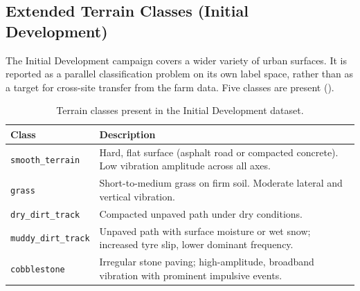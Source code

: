 \subsection{Extended Terrain Classes (Initial Development)}

The Initial Development campaign covers a wider variety of urban surfaces. It is reported as a parallel classification problem on its own label space, rather than as a target for cross-site transfer from the farm data. Five classes are present
().

\begin{table}[H]
\centering
\caption{Terrain classes present in the Initial Development dataset.}
\label{tab:main_terrain_classes}
\begin{tabular}{lp{10cm}}
\toprule
\textbf{Class} & \textbf{Description} \\
\midrule
\texttt{smooth\_terrain}    & Hard, flat surface (asphalt road or compacted concrete). Low vibration amplitude across all axes. \\
\texttt{grass}              & Short-to-medium grass on firm soil. Moderate lateral and vertical vibration. \\
\texttt{dry\_dirt\_track}   & Compacted unpaved path under dry conditions. \\
\texttt{muddy\_dirt\_track} & Unpaved path with surface moisture or wet snow; increased tyre slip, lower dominant frequency. \\
\texttt{cobblestone}        & Irregular stone paving; high-amplitude, broadband vibration with prominent impulsive events. \\
\bottomrule
\end{tabular}
\end{table}

